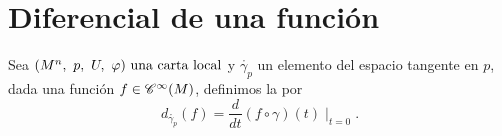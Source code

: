 \section{Diferencial de una función}\label{sec:diferencial-de-una-funcion}
\begin{definition}
  Sea $(M^n,\ p,\ U,\ \varphi)\textmd{ una carta local}$ y $\mathring{\gamma_p}$ un elemento del espacio tangente en $p$, dada una
  función
  $f\in\mathscr{C}^\infty(M)$, definimos la  por
  \begin{equation}
    \label{eq:diferencial-funcion-punto}
    d_{\mathring{\gamma_p}}(f)=\frac{d}{dt}(f\circ\gamma)(t)\mid_{t=0}.
  \end{equation}
\end{definition}

